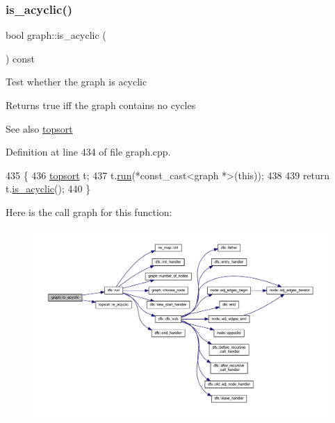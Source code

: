 \subsubsection{\texorpdfstring{is\+\_\+acyclic()}{is\_acyclic()}}
{\footnotesize\ttfamily bool graph\+::is\+\_\+acyclic (\begin{DoxyParamCaption}{ }\end{DoxyParamCaption}) const\hspace{0.3cm}{\ttfamily [inherited]}}

Test whether the graph is acyclic

\begin{DoxyReturn}{Returns}
true iff the graph contains no cycles 
\end{DoxyReturn}
\begin{DoxySeeAlso}{See also}
\mbox{\hyperlink{classtopsort}{topsort}} 
\end{DoxySeeAlso}


Definition at line 434 of file graph.\+cpp.


\begin{DoxyCode}
435 \{
436     \mbox{\hyperlink{classtopsort}{topsort}} t;
437     t.\mbox{\hyperlink{classdfs_af0863b8974d5fd58cd0375c78ed8163b}{run}}(*const\_cast<graph *>(\textcolor{keyword}{this}));
438 
439     \textcolor{keywordflow}{return} t.\mbox{\hyperlink{classtopsort_a05a4cb00bbd60859f4939355b23c25f1}{is\_acyclic}}();
440 \}
\end{DoxyCode}
Here is the call graph for this function\+:
\nopagebreak
\begin{figure}[H]
\begin{center}
\leavevmode
\includegraphics[width=350pt]{classgraph_a9b500cb72826fe5bbefa8c71bc4642fa_cgraph}
\end{center}
\end{figure}
\mbox{\label{classgraph_a8014a8073dd640c91cbd4fc1fb6e6071}} 
